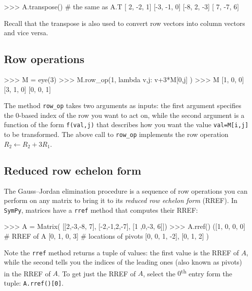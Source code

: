 \small
\begin{verbatimtab}
>>> A.transpose()    # the same as A.T
[ 2, -2,  1]
[-3, -1,  0]
[-8,  2, -3]
[ 7, -7,  6]
\end{verbatimtab}
\normalsize

\noindent
Recall that the transpose is also used to convert row vectors into column vectors and vice versa.


\subsection{Row operations}
\label{matrices:row_operations}

\small
\begin{verbatimtab}
>>> M = eye(3)
>>> M.row_op(1, lambda v,j: v+3*M[0,j] )
>>> M
[1, 0, 0]
[3, 1, 0]
[0, 0, 1]
\end{verbatimtab}
\normalsize

The method \texttt{row\_op} takes two arguments as inputs:
the first argument specifies the $0$-based index of the row you want to act on,
while the second argument is a function of the form \texttt{f(val,j)}
that describes how you want the value \texttt{val=M[i,j]} to be transformed.
The above call to \texttt{row\_op} implements the row operation $R_2 \gets R_2 + 3R_1$.


\subsection{Reduced row echelon form}
\label{matrices:reduced_row_echelon_form}

The Gauss--Jordan elimination procedure is a sequence of row operations you can perform
on any matrix to bring it to its \emph{reduced row echelon form} (RREF).
In \texttt{SymPy}, matrices have a \texttt{rref} method that computes their RREF: 

\small
\begin{verbatimtab}
>>> A = Matrix( [[2,-3,-8, 7],
                 [-2,-1,2,-7],
                 [1 ,0,-3, 6]])
>>> A.rref()
([1, 0, 0,  0]  # RREF of A
 [0, 1, 0,  3]                    # locations of pivots
 [0, 0, 1, -2],                   [0, 1, 2]              )
\end{verbatimtab}
\normalsize

\noindent
Note the \texttt{rref} method returns a tuple of values:
the first value is the RREF of $A$,
while the second tells you the indices of the leading ones (also known as pivots) in the RREF of $A$.
To get just the RREF of $A$, select the $0$\textsuperscript{th} entry form the tuple: \texttt{A.rref()[0]}.


